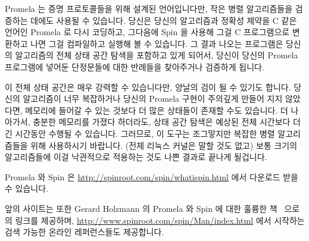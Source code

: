 Promela 는 증명 프로토콜들을 위해 설계된 언어입니다만, 작은 병렬 알고리즘들을
검증하는 데에도 사용될 수 있습니다.
당신은 당신의 알고리즘과 정확성 제약을 C 같은 언어인 Promela 로 다시 코딩하고,
그다음에 Spin 을 사용해 그걸 C 프로그램으로 변환하고 나면 그걸 컴파일하고
실행해 볼 수 있습니다.
그 결과 나오는 프로그램은 당신의 알고리즘의 전체 상태 공간 탐색을 포함하고 있게
되어서, 당신이 당신의 Promela 프로그램에 넣어둔 단정문들에 대한 반례들을
찾아주거나 검증하게 됩니다.
\iffalse

Promela is a language designed to help verify protocols, but which
can also be used to verify small parallel algorithms.
You recode your algorithm and correctness constraints in the C-like
language Promela, and then use Spin to translate it into a C program
that you can compile and run.
The resulting program conducts a full state-space search of your
algorithm, either verifying or finding counter-examples for
assertions that you can include in your Promela program.
\fi

이 전체 상태 공간은 매우 강력할 수 있습니다만, 양날의 검이 될 수 있기도 합니다.
당신의 알고리즘이 너무 복잡하거나 당신의 Promela 구현이 주의깊게 만들어 지지
않았다면, 메모리에 들어갈 수 있는 것보다 더 많은 상태들이 존재할 수도 있습니다.
더 나아가서, 충분한 메모리를 가졌다 하더라도, 상태 공간 탐색은 예상된 전체
시간보다 더 긴 시간동안 수행될 수 있습니다.
그러므로, 이 도구는 조그맣지만 복잡한 병렬 알고리즘들을 위해 사용하시기
바랍니다.
(전체 리눅스 커널은 말할 것도 없고) 보통 크기의 알고리즘들에 이걸 낙관적으로
적용하는 것도 나쁜 결과로 끝나게 될겁니다.

Promela 와 Spin 은 \url{http://spinroot.com/spin/whatispin.html} 에서 다운로드
받을 수 있습니다.
\iffalse

This full-state search can be extremely powerful, but can also be a two-edged
sword.
If your algorithm is too complex or your Promela implementation is
careless, there might be more states than fit in memory.
Furthermore, even given sufficient memory, the state-space search might
well run for longer than the expected lifetime of the universe.
Therefore, use this tool for compact but complex parallel algorithms.
Attempts to naively apply it to even moderate-scale algorithms (let alone
the full Linux kernel) will end badly.

Promela and Spin may be downloaded from
\url{http://spinroot.com/spin/whatispin.html}.
\fi

앞의 사이트는 또한 Gerard Holzmann 의 Promela 와 Spin 에 대한 훌륭한
책~\cite{Holzmann03a} 으로의 링크를 제공하며,
\url{http://www.spinroot.com/spin/Man/index.html} 에서 시작하는 검색 가능한
온라인 레퍼런스들도 제공합니다.

